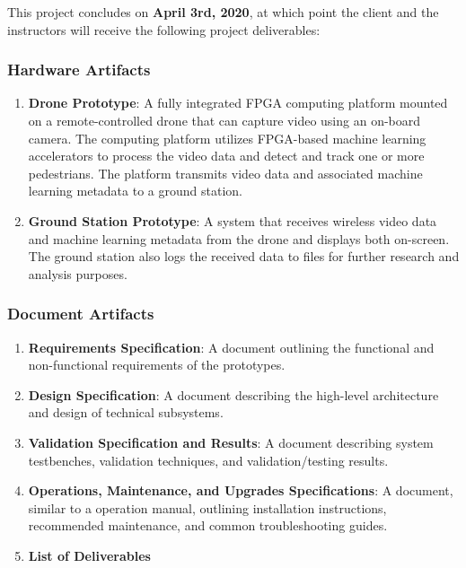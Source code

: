 This project concludes on \textbf{April 3rd, 2020}, at which point the client
and the instructors will receive the following project deliverables:

\subsubsection{Hardware Artifacts}

\begin{enumerate}

\item \textbf{Drone Prototype}:
A fully integrated FPGA computing platform mounted on a remote-controlled
drone that can capture video using an on-board camera.
The computing platform utilizes FPGA-based machine learning accelerators to 
process the video data and detect and track one or more pedestrians.
The platform transmits video data and associated machine learning metadata
to a ground station.

\item \textbf{Ground Station Prototype}:
A system that receives wireless video data and machine learning metadata from
the drone and displays both on-screen. The ground station also logs the received data 
to files for further research and analysis purposes.

\end{enumerate}

\subsubsection{Document Artifacts}\label{document-artifacts}

\begin{enumerate}

\item\textbf{Requirements Specification}:
A document outlining the functional and non-functional requirements
of the prototypes.

\item \textbf{Design Specification}:
A document describing the high-level architecture and design of technical subsystems.

\item \textbf{Validation Specification and Results}:
A document describing system testbenches, validation techniques, and validation/testing results.

\item \textbf{Operations, Maintenance, and Upgrades Specifications}:
A document, similar to a operation manual, outlining installation instructions,
recommended maintenance, and common troubleshooting guides.

\item \textbf{List of Deliverables}

\end{enumerate}

